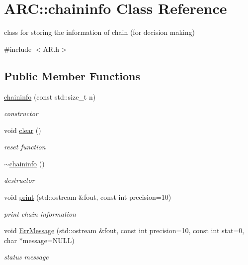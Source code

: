 \hypertarget{classARC_1_1chaininfo}{}\section{A\+RC\+:\+:chaininfo Class Reference}
\label{classARC_1_1chaininfo}


class for storing the information of chain (for decision making)  




{\ttfamily \#include $<$A\+R.\+h$>$}

\subsection*{Public Member Functions}
\begin{DoxyCompactItemize}
\item 
\hyperlink{classARC_1_1chaininfo_a9e67e1e081f3a09d8c8bec3b55d108d1}{chaininfo} (const std\+::size\+\_\+t n)
\begin{DoxyCompactList}\small\item\em constructor \end{DoxyCompactList}\item 
void \hyperlink{classARC_1_1chaininfo_ae65957f4d894671dd467a376b898e1a5}{clear} ()
\begin{DoxyCompactList}\small\item\em reset function \end{DoxyCompactList}\item 
\hyperlink{classARC_1_1chaininfo_aca51a64943e31e1ac33473fb90c39a17}{$\sim$chaininfo} ()
\begin{DoxyCompactList}\small\item\em destructor \end{DoxyCompactList}\item 
void \hyperlink{classARC_1_1chaininfo_a75c849e7360a20d88934079a8f5d75f4}{print} (std\+::ostream \&fout, const int precision=10)
\begin{DoxyCompactList}\small\item\em print chain information \end{DoxyCompactList}\item 
void \hyperlink{classARC_1_1chaininfo_a07ad3dcb9540f02984195045357166b0}{Err\+Message} (std\+::ostream \&fout, const int precision=10, const int stat=0, char $\ast$message=N\+U\+LL)
\begin{DoxyCompactList}\small\item\em status message \end{DoxyCompactList}\end{DoxyCompactItemize}
